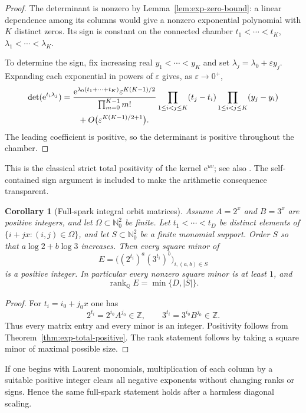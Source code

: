 \documentclass[11pt,oneside]{article}
\newtheorem{corollary}[theorem]{Corollary}
\theoremstyle{definition}
\theoremstyle{remark}
\newcommand{\Nzero}{\mathbb N_0}
\newcommand{\Z}{\mathbb Z}
\newcommand{\Q}{\mathbb Q}
\newcommand{\rank}{\operatorname{rank}}
\newcommand{\ee}{\mathrm e}
\begin{document}
\begin{proof}
The determinant is nonzero by Lemma~\ref{lem:exp-zero-bound}: a linear dependence among its
columns would give a nonzero exponential polynomial with $K$ distinct zeros.  Its sign is
constant on the connected chamber
$t_1<\cdots<t_K$, $\lambda_1<\cdots<\lambda_K$.

To determine the sign, fix increasing real $y_1<\cdots<y_K$ and set
$\lambda_j=\lambda_0+\varepsilon y_j$.  Expanding each exponential in powers of
$\varepsilon$ gives, as $\varepsilon\to0^+$,
\[
\begin{split}
  \det(\ee^{t_i\lambda_j})
  &={\ee^{\lambda_0(t_1+\cdots+t_K)}
       \varepsilon^{K(K-1)/2}\over\prod_{m=0}^{K-1}m!}
    \prod_{1\le i<j\le K}(t_j-t_i)
    \prod_{1\le i<j\le K}(y_j-y_i)\\
  &\qquad+O\bigl(\varepsilon^{K(K-1)/2+1}\bigr).
\end{split}
\]
The leading coefficient is positive, so the determinant is positive throughout the chamber.
\end{proof}

This is the classical strict total positivity of the kernel $\ee^{uv}$; see also
\cite{KarlinStudden}.  The self-contained sign argument is included to make the arithmetic
consequence transparent.

\begin{corollary}[Full-spark integral orbit matrices]
\label{cor:integer-full-spark}
Assume $A=2^x$ and $B=3^x$ are positive integers, and let
$\Omega\subset\Nzero^2$ be finite.  Let $t_1<\cdots<t_D$ be distinct elements of
$\{i+jx:(i,j)\in\Omega\}$, and let $S\subset\Nzero^2$ be a finite monomial support.  Order $S$ so that
$a\log2+b\log3$ increases.  Then every square minor of
\[
  E=\bigl((2^{t_i})^a(3^{t_i})^b\bigr)_{i,(a,b)\in S}
\]
is a positive integer.  In particular every nonzero square minor is at least $1$, and
\[
  \rank_{\Q}E=\min\{D,|S|\}.
\]
\end{corollary}

\begin{proof}
For $t_i=i_0+j_0x$ one has
\[
  2^{t_i}=2^{i_0}A^{j_0}\in\Z,
  \qquad
  3^{t_i}=3^{i_0}B^{j_0}\in\Z.
\]
Thus every matrix entry and every minor is an integer.  Positivity follows from
Theorem~\ref{thm:exp-total-positive}.  The rank statement follows by taking a square minor of
maximal possible size.
\end{proof}

If one begins with Laurent monomials, multiplication of each column by a suitable positive
integer clears all negative exponents without changing ranks or signs.  Hence the same
full-spark statement holds after a harmless diagonal scaling.
\end{document}

